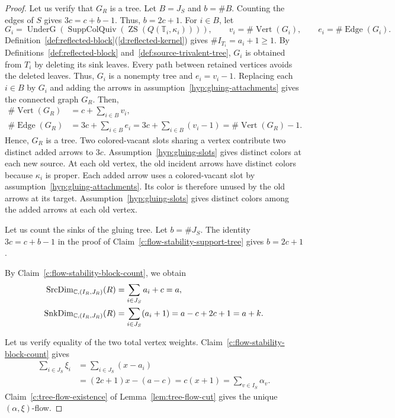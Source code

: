 \begin{proof}
 Let us verify that $G_R$ is a tree.
Let $B=J_{S}$ and $b=\#B$.
Counting the edges of $S$ gives $3c=c+b-1$. Thus, $b=2c+1$.
For $i\in B$, let
\[
 G_i=\operatorname{UnderG}(\operatorname{SuppColQuiv}(\operatorname{ZS}(Q(\mathbb T_i,\kappa_i)))),\qquad
 v_i=\#\operatorname{Vert}(G_i),\qquad e_i=\#\operatorname{Edge}(G_i).
\]
Definition~\ref{def:reflected-block}(\ref{d:reflected-kernel}) gives $\#I_{T_i}=a_i+1\ge1$.
By Definitions~\ref{def:reflected-block} and~\ref{def:source-trivalent-tree}, $G_i$ is obtained from $T_i$ by deleting its sink leaves.
Every path between retained vertices avoids the deleted leaves. Thus, $G_i$ is a nonempty tree and $e_i=v_i-1$.
Replacing each $i\in B$ by $G_i$ and adding the arrows in assumption~\ref{hyp:gluing-attachments} gives the connected graph $G_R$.
Then,
\[
\begin{aligned}
 \#\operatorname{Vert}(G_R)&=c+\sum_{i\in B}v_i,\\
 \#\operatorname{Edge}(G_R)&=3c+\sum_{i\in B}e_i
 =3c+\sum_{i\in B}(v_i-1)
 =\#\operatorname{Vert}(G_R)-1.
\end{aligned}
\]
Hence, $G_R$ is a tree. Two colored-vacant slots sharing a vertex contribute two distinct added arrows to $3c$.
 Assumption~\ref{hyp:gluing-slots} gives distinct colors at each new source.
At each old vertex, the old incident arrows have distinct colors because $\kappa_i$ is proper.
Each added arrow uses a colored-vacant slot by assumption~\ref{hyp:gluing-attachments}.
Its color is therefore unused by the old arrows at its target.
Assumption~\ref{hyp:gluing-slots} gives distinct colors among the added arrows at each old vertex.

 Let us count the sinks of the gluing tree.
Let $b=\#J_{S}$.
The identity $3c=c+b-1$ in the proof of Claim~\ref{c:flow-stability-support-tree} gives $b=2c+1$.

By Claim~\ref{c:flow-stability-block-count}, we obtain
\[
\begin{aligned}
 \operatorname{SrcDim}_{\mathbb C,(I_R,J_R)}(R)
 &=\sum_{i\in J_{S}}a_i+c=a,\\
 \operatorname{SnkDim}_{\mathbb C,(I_R,J_R)}(R)
 &=\sum_{i\in J_{S}}(a_i+1)=a-c+2c+1=a+k.
\end{aligned}
\]

 Let us verify equality of the two total vertex weights.
Claim~\ref{c:flow-stability-block-count} gives
\[
\begin{aligned}
 \sum_{i\in J_{S}}\xi_i
 &=\sum_{i\in J_{S}}(x-a_i)\\
 &=(2c+1)x-(a-c)=c(x+1)
 =\sum_{v\in I_{S}}\alpha_v.
\end{aligned}
\]
Claim~\ref{c:tree-flow-existence} of Lemma~\ref{lem:tree-flow-cut} gives the unique $(\alpha,\xi)$-flow.


\end{proof}
